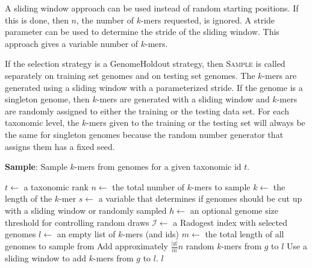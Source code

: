 \documentclass[12pt, letterpaper]{article}
\begin{document}
A sliding window approach can be used instead of random starting positions.  If this is done, then $n$, the number of $k$-mers requested, is ignored.  A stride parameter can be used to determine the stride of the sliding window.  This approach gives a variable number of $k$-mers.

If the selection strategy is a GenomeHoldout strategy, then \textsc{Sample} is called separately on training set genomes and on testing set genomes.  The $k$-mers are generated using a sliding window with a parameterized stride.  If the genome is a singleton genome, then $k$-mers are generated with a sliding window and $k$-mers are randomly assigned to either the training or the testing data set.  For each taxonomic level, the $k$-mers given to the training or the testing set will always be the same for singleton genomes because the random number generator that assigns them has a fixed seed.

\begin{algorithm}[h!]
\caption{\textbf{Sample}: Sample $k$-mers from genomes for a given taxonomic id $t$.}
\label{Sample}
\begin{algorithmic}
\State $t \gets$ a taxonomic rank
\State $n \gets$ the total number of $k$-mers to sample
\State $k \gets$ the length of the $k$-mer
\State $s \gets$ a variable that determines if genomes should be cut up with a sliding window or randomly sampled
\State $h \gets$ an optional genome size threshold for controlling random draws
\State $\mathcal{I} \gets$ a Radogest index with selected genomes
\State $l \gets$ an empty list of $k$-mers (and ids)
\State $m \gets$ the total length of all genomes to sample from
\State Add approximately $\frac{|g|}{m} n$ random $k$-mers from $g$ to $l$
\Else
\State Use a sliding window to add $k$-mers from $g$ to $l$.
\EndIf
\EndFor
\EndFor
\State \Return $l$
\EndProcedure
\end{algorithmic}
\end{algorithm}
\end{document}
